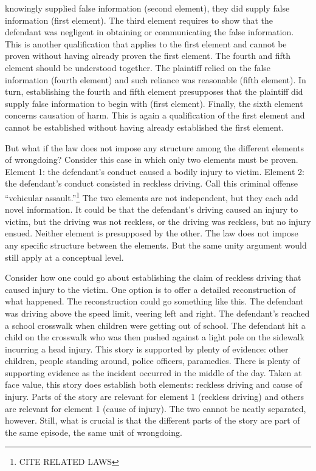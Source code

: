 \documentclass[
  10pt,
  dvipsnames,enabledeprecatedfontcommands]{scrartcl}
\begin{document}
{  knowingly supplied false information (second element), they did supply
  false information (first element). The third element requires to show
  that the defendant was negligent in obtaining or communicating the
  false information. This is another qualification that applies to the
  first element and cannot be proven without having already proven the
  first element. The fourth and fifth element should be understood
  together. The plaintiff relied on the false information (fourth
  element) and such reliance was reasonable (fifth element). In turn,
  establishing the fourth and fifth element presupposes that the
  plaintiff did supply false information to begin with (first element).
  Finally, the sixth element concerns causation of harm. This is again a
  qualification of the first element and cannot be established without
  having already established the first element.}

But what if the law does not impose any structure among the different
elements of wrongdoing? Consider this case in which only two elements
must be proven. Element 1: the defendant's conduct caused a bodily
injury to victim. Element 2: the defendant's conduct consisted in
reckless driving. Call this criminal offense ``vehicular
assault.''\footnote{CITE RELATED LAWS} The two elements are not
independent, but they each add novel information. It could be that the
defendant's driving caused an injury to victim, but the driving was not
reckless, or the driving was reckless, but no injury ensued. Neither
element is presupposed by the other. The law does not impose any
specific structure between the elements. But the same unity argument
would still apply at a conceptual level.

Consider how one could go about establishing the claim of reckless
driving that caused injury to the victim. One option is to offer a
detailed reconstruction of what happened. The reconstruction could go
something like this. The defendant was driving above the speed limit,
veering left and right. The defendant's reached a school crosswalk when
children were getting out of school. The defendant hit a child on the
crosswalk who was then pushed against a light pole on the sidewalk
incurring a head injury. This story is supported by plenty of evidence:
other children, people standing around, police officers, paramedics.
There is plenty of supporting evidence as the incident occurred in the
middle of the day. Taken at face value, this story does establish both
elements: reckless driving and cause of injury. Parts of the story are
relevant for element 1 (reckless driving) and others are relevant for
element 1 (cause of injury). The two cannot be neatly separated,
however. Still, what is crucial is that the different parts of the story
are part of the same episode, the same unit of wrongdoing.
\end{document}
